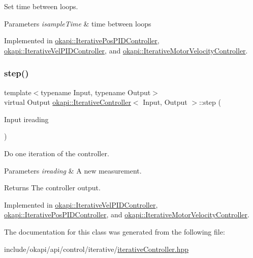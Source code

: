 Set time between loops.


\begin{DoxyParams}{Parameters}
{\em isample\+Time} & time between loops \\
\hline
\end{DoxyParams}


Implemented in \mbox{\hyperlink{classokapi_1_1IterativePosPIDController_a89e9f71510b9779282175fe3f5b071d6}{okapi\+::\+Iterative\+Pos\+P\+I\+D\+Controller}}, \mbox{\hyperlink{classokapi_1_1IterativeVelPIDController_aef5ba457e81871d47519413551856bb8}{okapi\+::\+Iterative\+Vel\+P\+I\+D\+Controller}}, and \mbox{\hyperlink{classokapi_1_1IterativeMotorVelocityController_ab94173452bbba03ffe51a4e700e2a870}{okapi\+::\+Iterative\+Motor\+Velocity\+Controller}}.

\mbox{\label{classokapi_1_1IterativeController_a751bcad1407099e629e3ffbe395daf2b}} 
\subsubsection{\texorpdfstring{step()}{step()}}
{\footnotesize\ttfamily template$<$typename Input, typename Output$>$ \\
virtual Output \mbox{\hyperlink{classokapi_1_1IterativeController}{okapi\+::\+Iterative\+Controller}}$<$ Input, Output $>$\+::step (\begin{DoxyParamCaption}\item[{Input}]{ireading }\end{DoxyParamCaption})\hspace{0.3cm}{\ttfamily [pure virtual]}}

Do one iteration of the controller.


\begin{DoxyParams}{Parameters}
{\em ireading} & A new measurement. \\
\hline
\end{DoxyParams}
\begin{DoxyReturn}{Returns}
The controller output. 
\end{DoxyReturn}


Implemented in \mbox{\hyperlink{classokapi_1_1IterativeVelPIDController_a7d75bb1622974daba25a9dec4df68325}{okapi\+::\+Iterative\+Vel\+P\+I\+D\+Controller}}, \mbox{\hyperlink{classokapi_1_1IterativePosPIDController_acec6d9ee4c41f78b54b6b28317bcd1e9}{okapi\+::\+Iterative\+Pos\+P\+I\+D\+Controller}}, and \mbox{\hyperlink{classokapi_1_1IterativeMotorVelocityController_a71f514d22293dc2e23de26ecd994d57c}{okapi\+::\+Iterative\+Motor\+Velocity\+Controller}}.



The documentation for this class was generated from the following file\+:\begin{DoxyCompactItemize}
\item 
include/okapi/api/control/iterative/\mbox{\hyperlink{iterativeController_8hpp}{iterative\+Controller.\+hpp}}\end{DoxyCompactItemize}
